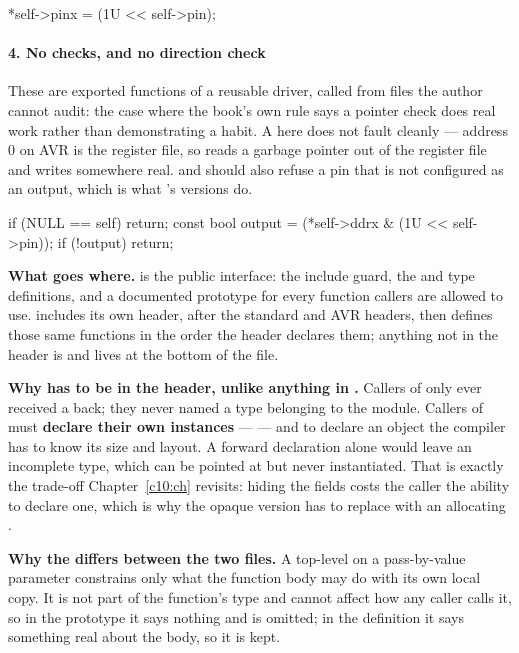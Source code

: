 \begin{ccode}
*self->pinx = (1U << self->pin);
\end{ccode}

\paragraph{4. No  checks, and no direction check}
These are exported functions of a reusable driver, called from files the author cannot audit: the
case where the book's own rule says a pointer check does real work rather than demonstrating a
habit. A   here does not fault cleanly --- address 0 on AVR is the register
file, so  reads a garbage pointer out of the register file and writes somewhere
real.  and  should also refuse a pin that is not configured
as an output, which is what 's versions do.

\begin{ccode}
if (NULL == self) { return; }
const bool output = (*self->ddrx & (1U << self->pin));
if (!output) { return; }
\end{ccode}

\textbf{What goes where.}  is the public interface: the include guard, the
 and  type definitions, and a documented prototype for every function
callers are allowed to use.  includes its own header, after the standard and AVR
headers, then defines those same functions in the order the header declares them; anything not in
the header is  and lives at the bottom of the file. 

\textbf{Why  has to be in the header, unlike anything in .} Callers of
 only ever received a  back; they never named a type belonging to the
module. Callers of  must \textbf{declare their own instances} ---
 --- and to declare an object the compiler has
to know its size and layout. A forward declaration alone would leave  an incomplete
type, which can be pointed at but never instantiated. That is exactly the trade-off
Chapter~\ref{c10:ch} revisits: hiding the fields costs the caller the ability to declare one, which
is why the opaque version has to replace  with an allocating .

\textbf{Why the  differs between the two files.} A top-level  on a
pass-by-value parameter constrains only what the function body may do with its own local copy. It
is not part of the function's type and cannot affect how any caller calls it, so in the prototype
it says nothing and is omitted; in the definition it says something real about the body, so it is
kept. 

